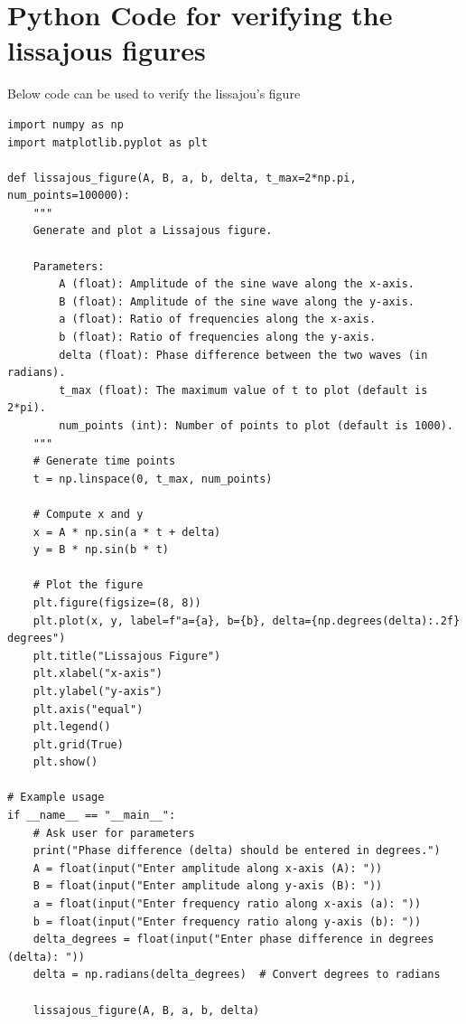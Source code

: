\documentclass[a4paper,12pt]{article}
\begin{document}
\section*{\color{myblue}Python Code for verifying the lissajous figures}
Below code can be used to verify the lissajou's figure
\begin{lstlisting}
import numpy as np
import matplotlib.pyplot as plt

def lissajous_figure(A, B, a, b, delta, t_max=2*np.pi, num_points=100000):
    """
    Generate and plot a Lissajous figure.

    Parameters:
        A (float): Amplitude of the sine wave along the x-axis.
        B (float): Amplitude of the sine wave along the y-axis.
        a (float): Ratio of frequencies along the x-axis.
        b (float): Ratio of frequencies along the y-axis.
        delta (float): Phase difference between the two waves (in radians).
        t_max (float): The maximum value of t to plot (default is 2*pi).
        num_points (int): Number of points to plot (default is 1000).
    """
    # Generate time points
    t = np.linspace(0, t_max, num_points)

    # Compute x and y
    x = A * np.sin(a * t + delta)
    y = B * np.sin(b * t)

    # Plot the figure
    plt.figure(figsize=(8, 8))
    plt.plot(x, y, label=f"a={a}, b={b}, delta={np.degrees(delta):.2f} degrees")
    plt.title("Lissajous Figure")
    plt.xlabel("x-axis")
    plt.ylabel("y-axis")
    plt.axis("equal")
    plt.legend()
    plt.grid(True)
    plt.show()

# Example usage
if __name__ == "__main__":
    # Ask user for parameters
    print("Phase difference (delta) should be entered in degrees.")
    A = float(input("Enter amplitude along x-axis (A): "))
    B = float(input("Enter amplitude along y-axis (B): "))
    a = float(input("Enter frequency ratio along x-axis (a): "))
    b = float(input("Enter frequency ratio along y-axis (b): "))
    delta_degrees = float(input("Enter phase difference in degrees (delta): "))
    delta = np.radians(delta_degrees)  # Convert degrees to radians

    lissajous_figure(A, B, a, b, delta)
\end{lstlisting}
\end{document}
